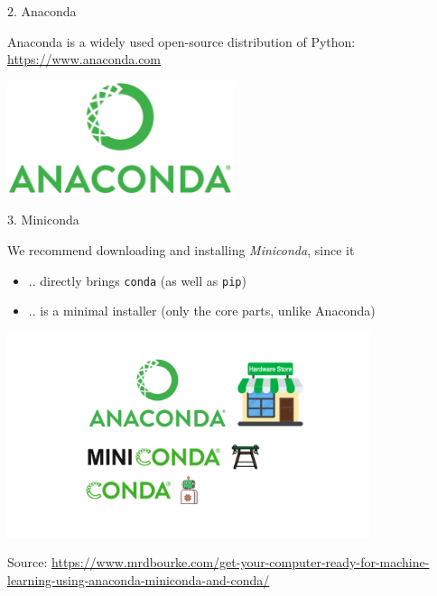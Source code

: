 
\begin{vbframe}{2. Anaconda}

\vfill

Anaconda is a widely used open-source distribution of Python: 
\url{https://www.anaconda.com}

\vspace{.5cm}

\centering
\includegraphics[width=0.5\textwidth]{figure/anaconda.png}

\vfill

\end{vbframe}


\begin{vbframe}{3. Miniconda}

\vfill

We recommend downloading and installing \textit{Miniconda}, since it

\begin{itemize}
	\item .. directly brings \texttt{conda} (as well as \texttt{pip})
	\item .. is a minimal installer (only the core parts, unlike Anaconda)
\end{itemize}

\centering
\includegraphics[width=0.8\textwidth]{figure/miniconda.png}

\tiny Source: \url{https://www.mrdbourke.com/get-your-computer-ready-for-machine-learning-using-anaconda-miniconda-and-conda/}

\vfill

\end{vbframe}

